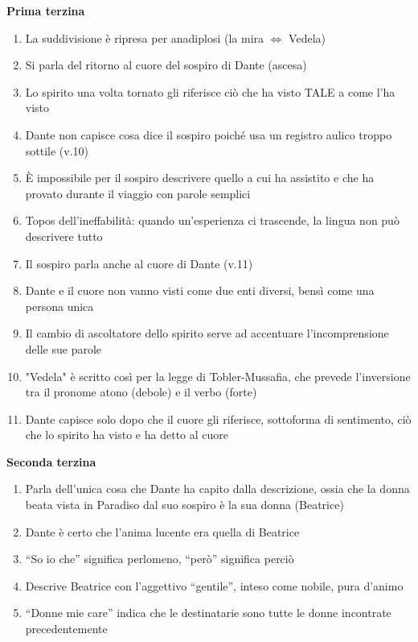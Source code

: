 \documentclass{article}
\begin{document}
\textbf{Prima terzina}
\begin{enumerate}
    \item La suddivisione è ripresa per anadiplosi (la mira $\Longleftrightarrow$ Vedela)
    \item Si parla del ritorno al cuore del sospiro di Dante (ascesa)
    \item Lo spirito una volta tornato gli riferisce ciò che ha visto TALE a come l'ha visto
    \item Dante non capisce cosa dice il sospiro poiché usa un registro aulico troppo sottile
        (v.10)
    \item È impossibile per il sospiro descrivere quello a cui ha assistito e che ha provato
        durante il viaggio con parole semplici
    \item Topos dell'ineffabilità: quando un'esperienza ci trascende, la lingua non può
        descrivere tutto
    \item Il sospiro parla anche al cuore di Dante (v.11)
    \item Dante e il cuore non vanno visti come due enti diversi, bensì come una persona unica
    \item Il cambio di ascoltatore dello spirito serve ad accentuare l'incomprensione delle sue
        parole
    \item "Vedela" è scritto così per la legge di Tobler-Mussafia, che prevede l'inversione tra
        il pronome atono (debole) e il verbo (forte)
    \item Dante capisce solo dopo che il cuore gli riferisce, sottoforma di sentimento, ciò che
        lo spirito ha visto e ha detto al cuore
\end{enumerate}

\textbf{Seconda terzina}
\begin{enumerate}
    \item Parla dell'unica cosa che Dante ha capito dalla descrizione, ossia che la donna
        beata vista in Paradiso dal suo sospiro è la sua donna (Beatrice)
    \item Dante è certo che l'anima lucente era quella di Beatrice
    \item ``So io che'' significa perlomeno, ``però'' significa perciò
    \item Descrive Beatrice con l'aggettivo ``gentile'', inteso come nobile, pura d'animo
    \item ``Donne mie care'' indica che le destinatarie sono tutte le donne incontrate
        precedentemente
\end{enumerate}
\end{document}
